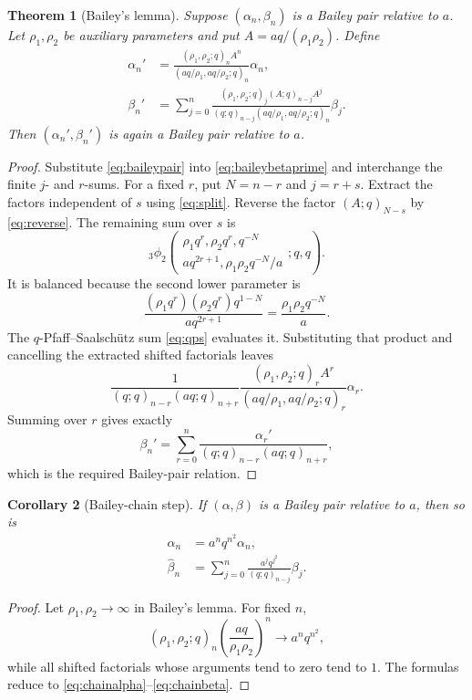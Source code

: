 \documentclass[11pt]{article}
\numberwithin{equation}{section}
\newtheorem{theorem}{Theorem}[section]
\newtheorem{corollary}[theorem]{Corollary}
\theoremstyle{definition}
\theoremstyle{remark}
\newcommand{\BaileyTransformedAlpha}{\widehat{\alpha}}
\newcommand{\BaileyTransformedBeta}{\widehat{\beta}}
\begin{document}
\begin{theorem}[Bailey's lemma]\label{thm:baileylemma}
Suppose $(\alpha_n,\beta_n)$ is a Bailey pair relative to $a$.  Let
$\rho_1,\rho_2$ be auxiliary parameters and put
$A=aq/(\rho_1\rho_2)$.  Define
\begin{align}
\alpha_n'&=
\frac{(\rho_1,\rho_2;q)_n A^n}
{(aq/\rho_1,aq/\rho_2;q)_n}\alpha_n,
\label{eq:baileyalphaprime}\\
\beta_n'&=\sum_{j=0}^n
\frac{(\rho_1,\rho_2;q)_j(A;q)_{n-j}A^j}
{(q;q)_{n-j}(aq/\rho_1,aq/\rho_2;q)_n}\beta_j.
\label{eq:baileybetaprime}
\end{align}
Then $(\alpha_n',\beta_n')$ is again a Bailey pair relative to $a$.
\end{theorem}
\begin{proof}
Substitute \eqref{eq:baileypair} into \eqref{eq:baileybetaprime} and
interchange the finite $j$- and $r$-sums.  For a fixed $r$, put
$N=n-r$ and $j=r+s$.  Extract the factors independent of $s$ using
\eqref{eq:split}.  Reverse the factor $(A;q)_{N-s}$ by
\eqref{eq:reverse}.  The remaining sum over $s$ is
\[
{}_3\phi_2\!\left(
\begin{matrix}\rho_1q^r,\rho_2q^r,q^{-N}\\
aq^{2r+1},\rho_1\rho_2q^{-N}/a
\end{matrix};q,q\right).
\]
It is balanced because the second lower parameter is
\[
\frac{(\rho_1q^r)(\rho_2q^r)q^{1-N}}{aq^{2r+1}}
=\frac{\rho_1\rho_2q^{-N}}a.
\]
The $q$-Pfaff--Saalsch\"utz sum \eqref{eq:qps} evaluates it.  Substituting
that product and cancelling the extracted shifted factorials leaves
\[
\frac1{(q;q)_{n-r}(aq;q)_{n+r}}
\frac{(\rho_1,\rho_2;q)_rA^r}
{(aq/\rho_1,aq/\rho_2;q)_r}\alpha_r.
\]
Summing over $r$ gives exactly
\[
\beta_n'=\sum_{r=0}^n
\frac{\alpha_r'}{(q;q)_{n-r}(aq;q)_{n+r}},
\]
which is the required Bailey-pair relation.
\end{proof}

\begin{corollary}[Bailey-chain step]\label{cor:baileychain}
If $(\alpha,\beta)$ is a Bailey pair relative to $a$, then so is
\begin{align}
\BaileyTransformedAlpha_n&=a^nq^{n^2}\alpha_n,\label{eq:chainalpha}\\
\BaileyTransformedBeta_n&=\sum_{j=0}^n
\frac{a^jq^{j^2}}{(q;q)_{n-j}}\beta_j.
\label{eq:chainbeta}
\end{align}
\end{corollary}
\begin{proof}
Let $\rho_1,\rho_2\to\infty$ in Bailey's lemma.  For fixed $n$,
\[
(\rho_1,\rho_2;q)_n
\left(\frac{aq}{\rho_1\rho_2}\right)^n
\longrightarrow a^nq^{n^2},
\]
while all shifted factorials whose arguments tend to zero tend to $1$.
The formulas reduce to \eqref{eq:chainalpha}--\eqref{eq:chainbeta}.
\end{proof}
\end{document}
